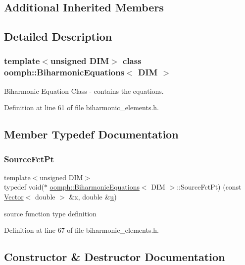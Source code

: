 \subsection*{Additional Inherited Members}


\subsection{Detailed Description}
\subsubsection*{template$<$unsigned D\+IM$>$\newline
class oomph\+::\+Biharmonic\+Equations$<$ D\+I\+M $>$}

Biharmonic Equation Class -\/ contains the equations. 

Definition at line 61 of file biharmonic\+\_\+elements.\+h.



\subsection{Member Typedef Documentation}
\mbox{\label{classoomph_1_1BiharmonicEquations_aafa48cd7bbc8ce4383224d1d2d0bfda3}} 
\subsubsection{\texorpdfstring{Source\+Fct\+Pt}{SourceFctPt}}
{\footnotesize\ttfamily template$<$unsigned D\+IM$>$ \\
typedef void($\ast$ \hyperlink{classoomph_1_1BiharmonicEquations}{oomph\+::\+Biharmonic\+Equations}$<$ D\+IM $>$\+::Source\+Fct\+Pt) (const \hyperlink{classoomph_1_1Vector}{Vector}$<$ double $>$ \&x, double \&\hyperlink{classoomph_1_1BiharmonicEquations_aebe4e72a90f24cde0f34cf14287e3721}{u})}



source function type definition 



Definition at line 67 of file biharmonic\+\_\+elements.\+h.



\subsection{Constructor \& Destructor Documentation}
\mbox{\label{classoomph_1_1BiharmonicEquations_a3b1e64c3b1834613c3ce2ba16191292d}} 
